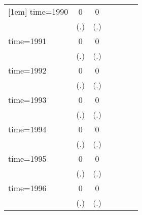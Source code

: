 \begin{table}[htbp]
\begin{tabular}{l*{6}{c}}
[1em]
time=1990           &           0         &           0         &                     &                     &                     &                     \\
                    &         (.)         &         (.)         &                     &                     &                     &                     \\
[1em]
time=1991           &           0         &           0         &                     &                     &                     &                     \\
                    &         (.)         &         (.)         &                     &                     &                     &                     \\
[1em]
time=1992           &           0         &           0         &                     &                     &                     &                     \\
                    &         (.)         &         (.)         &                     &                     &                     &                     \\
[1em]
time=1993           &           0         &           0         &                     &                     &                     &                     \\
                    &         (.)         &         (.)         &                     &                     &                     &                     \\
[1em]
time=1994           &           0         &           0         &                     &                     &                     &                     \\
                    &         (.)         &         (.)         &                     &                     &                     &                     \\
[1em]
time=1995           &           0         &           0         &                     &                     &                     &                     \\
                    &         (.)         &         (.)         &                     &                     &                     &                     \\
[1em]
time=1996           &           0         &           0         &                     &                     &                     &                     \\
                    &         (.)         &         (.)         &                     &                     &                     &                     \\

\end{tabular}
\end{table}

